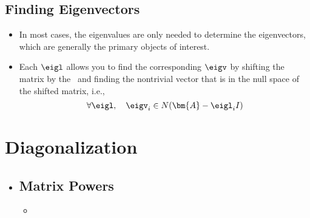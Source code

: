 \begin{itemize}
  \subsection{Finding Eigenvectors}\label{Eigenvectors}
  \begin{itemize}
   \item In most cases, the eigenvalues are only needed to determine the eigenvectors, which are generally the primary objects of interest.
   \item Each \(\eigl\) allows you to find the corresponding \(\eigv\) by shifting the matrix by the \eigl~and finding the nontrivial vector that is in the null space of the shifted matrix, i.e.,
   \[%
   \forall \eigl, \quad \eigv_i \in N(\bm{A}-\eigl_i I)
   \]%
   
  \end{itemize}
    
\end{itemize}


\section{Diagonalization}\label{Diagonalization}
\begin{itemize}
  \item []
  
  \subsection{Matrix Powers}\label{Matrix Powers}
  \begin{itemize}
    \item 
  \end{itemize}
  
\end{itemize}

